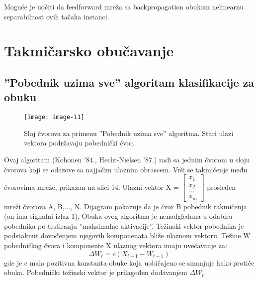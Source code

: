 \documentclass[fontsize=11bp, paper=a4]{scrarticle}
\begin{document}
Moguće je uočiti da feedforward mreža sa backpropagation obukom nelinearnu separabilnost ovih tačaka instanci.

\section{Takmičarsko obučavanje}
\subsection{”Pobednik uzima sve” algoritam klasifikacije za obuku}
\begin{figure}[h!]
    \centering
    \texttt{[image: image-11]}
    \caption{Sloj čvorova za primenu ”Pobednik uzima sve” algoritma. Stari ulazi vektora podržavaju pobednički čvor.}
\end{figure}
Ovaj algoritam (Kohonen '84., Hecht-Nielsen '87.) radi sa jednim čvorom u sloju čvorova koji se odazove sa najjačim ulaznim obrascem. Vrši se takmičenje među čvorovima mreže, prikazan na slici 14. Ulazni vektor X = $\begin{bmatrix} x_1 \\ x_2 \\ ... \\ x_m \end{bmatrix}$ prosleđen mreži čvorova A, B,..., N. 
Dijagram pokazuje da je čvor B pobednik takmičenja (on ima signalni izlaz 1).
Obuka ovog algoritma je nenadgledana u odabiru pobednika po testiranju ''maksimalne aktivacije''. Težinski vektor pobednika je podstaknut dovođenjem njegovih komponenata bliže ulaznom vektoru. Težine W pobedničkog čvora i komponente X ulaznog vektora imaju uvećavanje za: 
$$
\Delta W_t = c(X_{t -1} - W_{t -1})
$$
gde je c mala pozitivna konstanta obuke koja uobičajeno se smanjuje kako protiče obuka. Pobednički težinski vektor je prilagođen dodavanjem $\Delta W_t$.
\end{document}
